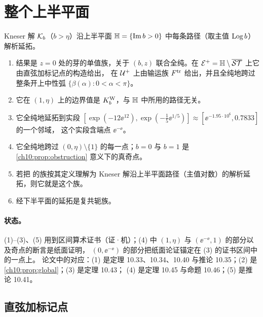 \section{整个上半平面}\label{ch10:sec:upper}

\begin{theorem}\label{thm:upper-half-plane}
Kneser 解 $\mathcal K_b$（$b>\eta$）沿上半平面 $\mathbb{H}=\{\operatorname{Im} b>0\}$ 中每条路径（取主值 $\operatorname{Log} b$）解析延拓。
\begin{enumerate}
\item 结果是 $z=0$ 处的芽的单值族，关于 $(b,z)$ 联合全纯。在 $\mathcal E^{+}=\mathbb{H}\setminus\overline{\mathcal{ST}}$ 上它由直弦加标记点的构造给出，
  在 $\mathcal U^{+}$ 上由输运族 $F^{\mathrm{tr}}$ 给出，并且全纯地跨过整条开上中性弧 $\{\beta(\alpha):0<\alpha<\pi\}$。
\item 它在 $(1,\eta)$ 上的边界值是 $K^{\mathrm W}_b$，与 $\mathbb{H}$ 中所用的路径无关。
\item 它全纯地延拓到实段 $[\exp(-12\ee^{12}),\exp(-\tfrac15\ee^{1/5})]\approx[\ee^{-1.95\cdot10^6},0.7833]$ 的一个邻域，
  这个实段含端点 $\ee^{-\ee}$。
\item 它全纯地跨过 $(0,\eta)\setminus\{1\}$ 的每一点；$b=0$ 与 $b=1$ 是 \cref{ch10:prop:obstruction} 意义下的真奇点。
\item 若把 \cite{Paulsen2019} 的族按其定义理解为 Kneser 解沿上半平面路径（主值对数）的解析延拓，则它就是这个族。
\item 经下半平面的延拓是复共轭族。
\end{enumerate}
\end{theorem}

\paragraph{状态。}
(1)--(3)、(5) 用到区间算术证书（证·机）；(4) 中 $(1,\eta)$ 与 $(\ee^{-\ee},1)$ 的部分以及奇点的断言是纸面证明，
$(0,\ee^{-\ee})$ 的部分把纸面论证锚定在 (3) 的证书区间中的一点上。
论文中的对应：(1) 是定理 10.33、10.34、10.40 与推论 10.35；(2) 是 \cref{ch10:prop:global}；(3) 是定理 10.43；
(4) 是定理 10.45 与命题 10.46；(5) 是推论 10.41。

\subsection{直弦加标记点}

